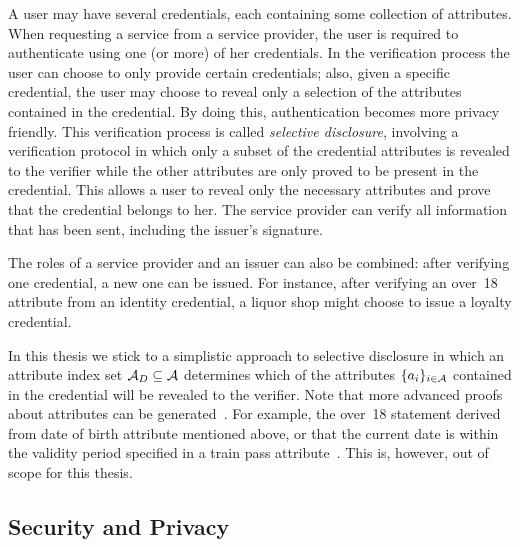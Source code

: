 A user may have several credentials, each containing some collection of
attributes. When requesting a service from a service provider,
the user is required to authenticate using one (or more)
of her credentials. In the verification process the user can choose to only
provide certain credentials; also, given a specific credential, the user may
choose to reveal only a selection of the attributes
 contained in the credential. By doing this, authentication
 becomes more privacy friendly. This verification process
is called \emph{selective disclosure}, involving
a verification protocol in which only a subset of the credential attributes
is revealed to the verifier while the other attributes are only proved to be
present in the credential. This allows a user to reveal only the necessary
attributes and prove that the credential belongs to her. The service provider
can verify all information that has been sent, including the issuer's signature.

The roles of a service provider and an issuer can also be
combined: after verifying one credential, a new one can be issued. For instance,
after verifying an \textsf{over~18} attribute from an identity
 credential, a liquor shop might choose to issue a
\textsf{loyalty} credential.

In this thesis we stick to a simplistic approach to selective disclosure in
which an attribute index set $\mathcal{A}_D \subseteq \mathcal{A}$
determines which of the attributes $\{a_i\}_{i \in \mathcal{A}}$
contained in the credential will be revealed to the verifier. Note that more
advanced proofs about attributes can be generated~\cite{IdemixCrypto2012}. For
example, the \textsf{over~18} statement  derived
from \textsf{date of birth} attribute mentioned above, or that the current date
is within the validity period specified in a \textsf{train pass}
attribute~\cite{Rogaar2011}. This is, however, out of scope for this thesis.

\subsection{Security and Privacy}

